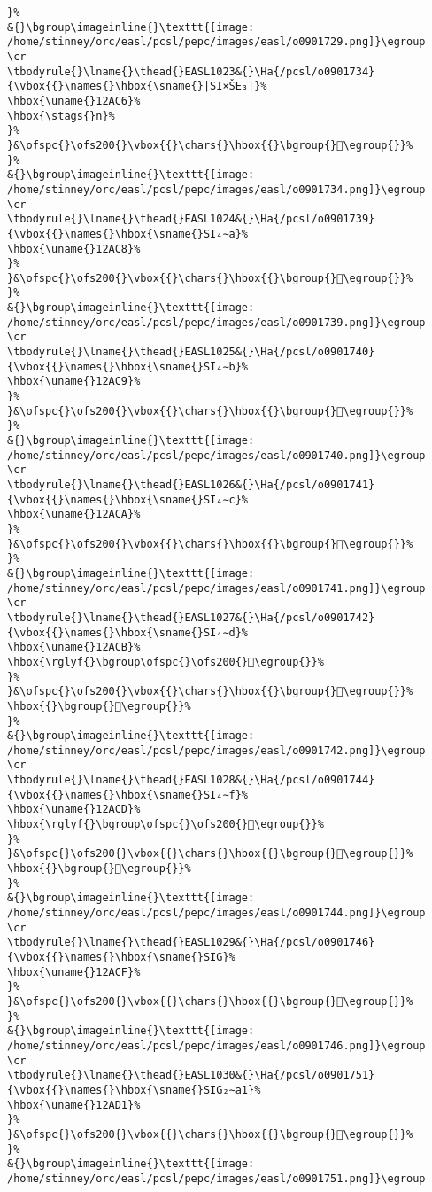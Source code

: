 \begin{verbatim}
}%
&{}\bgroup\imageinline{}\texttt{[image: /home/stinney/orc/easl/pcsl/pepc/images/easl/o0901729.png]}\egroup
\cr
\tbodyrule{}\lname{}\thead{}EASL1023&{}\Ha{/pcsl/o0901734}{\vbox{{}\names{}\hbox{\sname{}|SI×ŠE₃|}%
\hbox{\uname{}12AC6}%
\hbox{\stags{}n}%
}%
}&\ofspc{}\ofs200{}\vbox{{}\chars{}\hbox{{}\bgroup{}𒫆\egroup{}}%
}%
&{}\bgroup\imageinline{}\texttt{[image: /home/stinney/orc/easl/pcsl/pepc/images/easl/o0901734.png]}\egroup
\cr
\tbodyrule{}\lname{}\thead{}EASL1024&{}\Ha{/pcsl/o0901739}{\vbox{{}\names{}\hbox{\sname{}SI₄∼a}%
\hbox{\uname{}12AC8}%
}%
}&\ofspc{}\ofs200{}\vbox{{}\chars{}\hbox{{}\bgroup{}𒫈\egroup{}}%
}%
&{}\bgroup\imageinline{}\texttt{[image: /home/stinney/orc/easl/pcsl/pepc/images/easl/o0901739.png]}\egroup
\cr
\tbodyrule{}\lname{}\thead{}EASL1025&{}\Ha{/pcsl/o0901740}{\vbox{{}\names{}\hbox{\sname{}SI₄∼b}%
\hbox{\uname{}12AC9}%
}%
}&\ofspc{}\ofs200{}\vbox{{}\chars{}\hbox{{}\bgroup{}𒫉\egroup{}}%
}%
&{}\bgroup\imageinline{}\texttt{[image: /home/stinney/orc/easl/pcsl/pepc/images/easl/o0901740.png]}\egroup
\cr
\tbodyrule{}\lname{}\thead{}EASL1026&{}\Ha{/pcsl/o0901741}{\vbox{{}\names{}\hbox{\sname{}SI₄∼c}%
\hbox{\uname{}12ACA}%
}%
}&\ofspc{}\ofs200{}\vbox{{}\chars{}\hbox{{}\bgroup{}𒫊\egroup{}}%
}%
&{}\bgroup\imageinline{}\texttt{[image: /home/stinney/orc/easl/pcsl/pepc/images/easl/o0901741.png]}\egroup
\cr
\tbodyrule{}\lname{}\thead{}EASL1027&{}\Ha{/pcsl/o0901742}{\vbox{{}\names{}\hbox{\sname{}SI₄∼d}%
\hbox{\uname{}12ACB}%
\hbox{\rglyf{}\bgroup\ofspc{}\ofs200{}𒫋\egroup{}}%
}%
}&\ofspc{}\ofs200{}\vbox{{}\chars{}\hbox{{}\bgroup{}𒫋\egroup{}}%
\hbox{{}\bgroup{}𒫌\egroup{}}%
}%
&{}\bgroup\imageinline{}\texttt{[image: /home/stinney/orc/easl/pcsl/pepc/images/easl/o0901742.png]}\egroup
\cr
\tbodyrule{}\lname{}\thead{}EASL1028&{}\Ha{/pcsl/o0901744}{\vbox{{}\names{}\hbox{\sname{}SI₄∼f}%
\hbox{\uname{}12ACD}%
\hbox{\rglyf{}\bgroup\ofspc{}\ofs200{}𒫍\egroup{}}%
}%
}&\ofspc{}\ofs200{}\vbox{{}\chars{}\hbox{{}\bgroup{}𒫍\egroup{}}%
\hbox{{}\bgroup{}𒫎\egroup{}}%
}%
&{}\bgroup\imageinline{}\texttt{[image: /home/stinney/orc/easl/pcsl/pepc/images/easl/o0901744.png]}\egroup
\cr
\tbodyrule{}\lname{}\thead{}EASL1029&{}\Ha{/pcsl/o0901746}{\vbox{{}\names{}\hbox{\sname{}SIG}%
\hbox{\uname{}12ACF}%
}%
}&\ofspc{}\ofs200{}\vbox{{}\chars{}\hbox{{}\bgroup{}𒫏\egroup{}}%
}%
&{}\bgroup\imageinline{}\texttt{[image: /home/stinney/orc/easl/pcsl/pepc/images/easl/o0901746.png]}\egroup
\cr
\tbodyrule{}\lname{}\thead{}EASL1030&{}\Ha{/pcsl/o0901751}{\vbox{{}\names{}\hbox{\sname{}SIG₂∼a1}%
\hbox{\uname{}12AD1}%
}%
}&\ofspc{}\ofs200{}\vbox{{}\chars{}\hbox{{}\bgroup{}𒫑\egroup{}}%
}%
&{}\bgroup\imageinline{}\texttt{[image: /home/stinney/orc/easl/pcsl/pepc/images/easl/o0901751.png]}\egroup

\end{verbatim}
